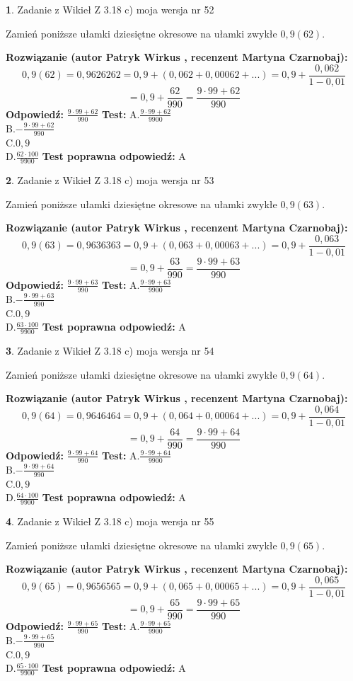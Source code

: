 \documentclass[12pt, a4paper]{article}
\theoremstyle{definition} %
\newtheorem{zad}{}
\newcommand{\zadStart}[1]{\begin{zad}#1\newline}
\newcommand{\zadStop}{\end{zad}}
\newcommand{\rozwStart}[2]{\noindent \textbf{Rozwiązanie (autor #1 , recenzent #2): }\newline}
\newcommand{\rozwStop}{\newline}
\newcommand{\odpStart}{\noindent \textbf{Odpowiedź:}\newline}
\newcommand{\odpStop}{\newline}
\newcommand{\testStart}{\noindent \textbf{Test:}\newline}
\newcommand{\testStop}{\newline}
\newcommand{\kluczStart}{\noindent \textbf{Test poprawna odpowiedź:}\newline}
\newcommand{\kluczStop}{\newline}
\begin{document}
\zadStart{Zadanie z Wikieł Z 3.18 c) moja wersja nr 52}

Zamień poniższe ułamki dziesiętne okresowe na ułamki zwykłe $0,9(62)$.
\zadStop
\rozwStart{Patryk Wirkus}{Martyna Czarnobaj}
$$0,9(62)=0,9626262=0,9+(0,062+0,00062+...)=0,9+\frac{0,062}{1-0,01}$$
$$=0,9+\frac{62}{990}=\frac{9\cdot99+62}{990}$$
\rozwStop
\odpStart
$\frac{9\cdot99+62}{990}$
\odpStop
\testStart
A.$\frac{9\cdot99+62}{9900}$\\ B.$-\frac{9\cdot99+62}{990}$\\ C.$0,9$\\ D.$\frac{62\cdot100}{9900}$
\testStop
\kluczStart
A
\kluczStop



\zadStart{Zadanie z Wikieł Z 3.18 c) moja wersja nr 53}

Zamień poniższe ułamki dziesiętne okresowe na ułamki zwykłe $0,9(63)$.
\zadStop
\rozwStart{Patryk Wirkus}{Martyna Czarnobaj}
$$0,9(63)=0,9636363=0,9+(0,063+0,00063+...)=0,9+\frac{0,063}{1-0,01}$$
$$=0,9+\frac{63}{990}=\frac{9\cdot99+63}{990}$$
\rozwStop
\odpStart
$\frac{9\cdot99+63}{990}$
\odpStop
\testStart
A.$\frac{9\cdot99+63}{9900}$\\ B.$-\frac{9\cdot99+63}{990}$\\ C.$0,9$\\ D.$\frac{63\cdot100}{9900}$
\testStop
\kluczStart
A
\kluczStop



\zadStart{Zadanie z Wikieł Z 3.18 c) moja wersja nr 54}

Zamień poniższe ułamki dziesiętne okresowe na ułamki zwykłe $0,9(64)$.
\zadStop
\rozwStart{Patryk Wirkus}{Martyna Czarnobaj}
$$0,9(64)=0,9646464=0,9+(0,064+0,00064+...)=0,9+\frac{0,064}{1-0,01}$$
$$=0,9+\frac{64}{990}=\frac{9\cdot99+64}{990}$$
\rozwStop
\odpStart
$\frac{9\cdot99+64}{990}$
\odpStop
\testStart
A.$\frac{9\cdot99+64}{9900}$\\ B.$-\frac{9\cdot99+64}{990}$\\ C.$0,9$\\ D.$\frac{64\cdot100}{9900}$
\testStop
\kluczStart
A
\kluczStop



\zadStart{Zadanie z Wikieł Z 3.18 c) moja wersja nr 55}

Zamień poniższe ułamki dziesiętne okresowe na ułamki zwykłe $0,9(65)$.
\zadStop
\rozwStart{Patryk Wirkus}{Martyna Czarnobaj}
$$0,9(65)=0,9656565=0,9+(0,065+0,00065+...)=0,9+\frac{0,065}{1-0,01}$$
$$=0,9+\frac{65}{990}=\frac{9\cdot99+65}{990}$$
\rozwStop
\odpStart
$\frac{9\cdot99+65}{990}$
\odpStop
\testStart
A.$\frac{9\cdot99+65}{9900}$\\ B.$-\frac{9\cdot99+65}{990}$\\ C.$0,9$\\ D.$\frac{65\cdot100}{9900}$
\testStop
\kluczStart
A
\kluczStop
\end{document}
